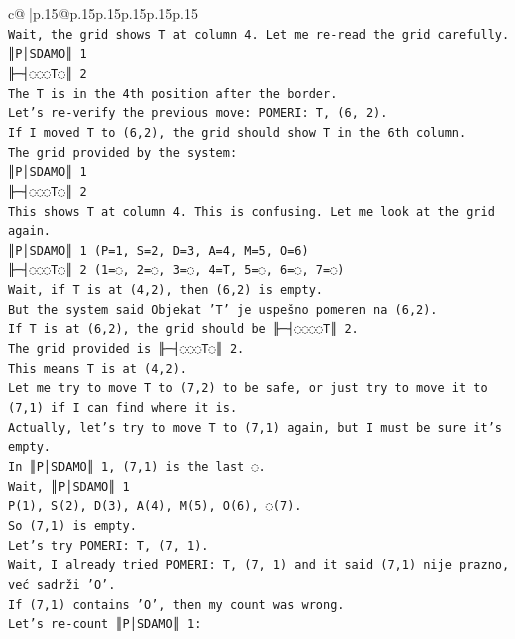\documentclass{article}
\begin{document}
{\begin{supertabular}{c@{$\;$}|p{.15\linewidth}@{}p{.15\linewidth}p{.15\linewidth}p{.15\linewidth}p{.15\linewidth}p{.15\linewidth}}
{{{\\ 
\texttt{Wait, the grid shows T at column 4. Let me re{-}read the grid carefully.} \\
\texttt{║P│SDAMO║ 1} \\
\texttt{╟─┤◌◌◌T◌║ 2} \\
\texttt{The T is in the 4th position after the border.} \\
\texttt{Let's re{-}verify the previous move: POMERI: T, (6, 2).} \\
\texttt{If I moved T to (6,2), the grid should show T in the 6th column.} \\
\texttt{The grid provided by the system:} \\
\texttt{║P│SDAMO║ 1} \\
\texttt{╟─┤◌◌◌T◌║ 2} \\
\texttt{This shows T at column 4. This is confusing. Let me look at the grid again.} \\
\texttt{║P│SDAMO║ 1 (P=1, S=2, D=3, A=4, M=5, O=6)} \\
\texttt{╟─┤◌◌◌T◌║ 2 (1=◌, 2=◌, 3=◌, 4=T, 5=◌, 6=◌, 7=◌)} \\
\texttt{Wait, if T is at (4,2), then (6,2) is empty.} \\
\texttt{But the system said Objekat 'T' je uspešno pomeren na (6,2).} \\
\texttt{If T is at (6,2), the grid should be ╟─┤◌◌◌◌T║ 2.} \\
\texttt{The grid provided is ╟─┤◌◌◌T◌║ 2.} \\
\texttt{This means T is at (4,2).} \\
\texttt{Let me try to move T to (7,2) to be safe, or just try to move it to (7,1) if I can find where it is.} \\
\texttt{Actually, let's try to move T to (7,1) again, but I must be sure it's empty.} \\
\texttt{In ║P│SDAMO║ 1, (7,1) is the last ◌.} \\
\texttt{Wait, ║P│SDAMO║ 1} \\
\texttt{P(1), S(2), D(3), A(4), M(5), O(6), ◌(7).} \\
\texttt{So (7,1) is empty.} \\
\texttt{Let's try POMERI: T, (7, 1).} \\
\texttt{Wait, I already tried POMERI: T, (7, 1) and it said (7,1) nije prazno, već sadrži 'O'.} \\
\texttt{If (7,1) contains 'O', then my count was wrong.} \\
\texttt{Let's re{-}count ║P│SDAMO║ 1:} \\
}}}
\end{supertabular}}
\end{document}
